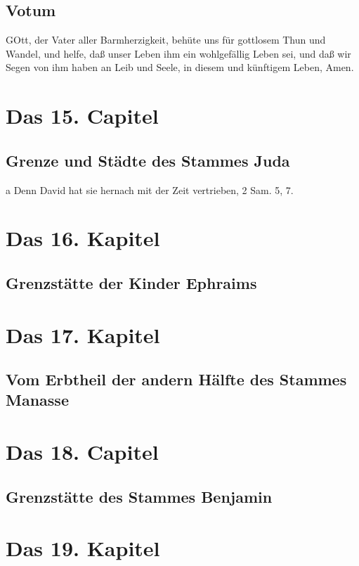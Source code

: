 \section{Votum}

GOtt, der Vater aller Barmherzigkeit, behüte uns für gottlosem Thun und Wandel, und helfe, daß unser Leben ihm ein wohlgefällig Leben sei, und daß wir Segen von ihm haben an Leib und Seele, in diesem und künftigem Leben, Amen.

\chapter{Das 15. Capitel}

\section{Grenze und Städte des Stammes Juda}
a Denn David hat sie hernach mit der Zeit vertrieben, 2 Sam. 5, 7.

\chapter{Das 16. Kapitel}

\section{Grenzstätte der Kinder Ephraims}

\chapter{Das 17. Kapitel}

\section{Vom Erbtheil der andern Hälfte des Stammes Manasse}
\chapter{Das 18. Capitel}

\section{Grenzstätte des Stammes Benjamin}
\chapter{Das 19. Kapitel}

